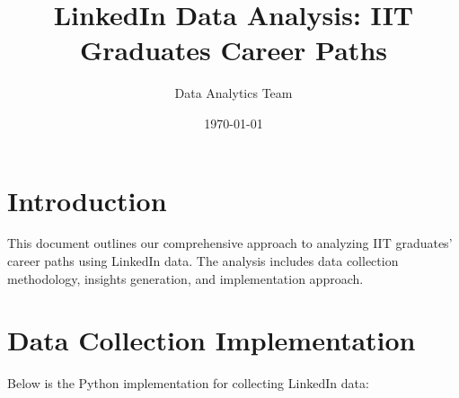 \documentclass{article}
\title{LinkedIn Data Analysis: IIT Graduates Career Paths}
\author{Data Analytics Team}
\date{\today}
\begin{document}
\maketitle

\section{Introduction}
This document outlines our comprehensive approach to analyzing IIT graduates' career paths using LinkedIn data. The analysis includes data collection methodology, insights generation, and implementation approach.

\section{Data Collection Implementation}
Below is the Python implementation for collecting LinkedIn data:
\end{document}
